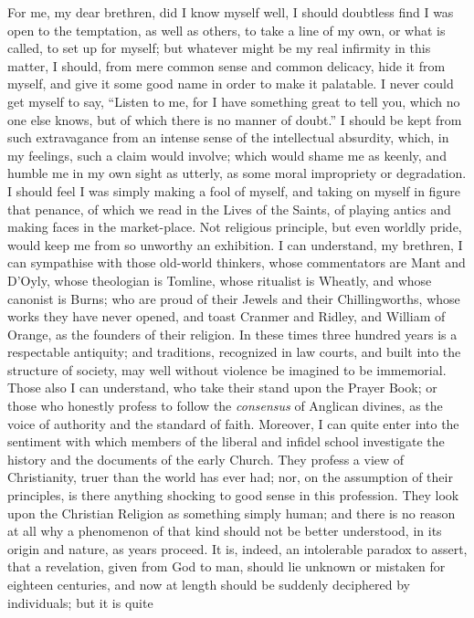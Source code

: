 For me, my dear brethren, did I know myself well, I should
doubtless find I was open to the temptation, as well as others, to
take a line of my own, or what is called, to set up for myself; but
whatever might be my real infirmity in this matter, I should, from
mere common sense and common delicacy, hide it from myself, and give
it some good name in order to make it palatable. I never could get
myself to say, ``Listen to me, for I have something great to tell
you, which no one else knows, but of which there is no manner of
doubt.'' I should be kept from such extravagance from an intense
sense of the intellectual absurdity, which, in my feelings, such a
claim would involve; which would shame me as keenly, and humble me in
my own sight as utterly, as some moral impropriety or degradation. I
should feel I was simply making a fool of myself, and taking on myself
in figure that penance, of which we read in the Lives of the Saints,
of playing antics and making faces in the market-place. Not religious
principle, but even worldly pride, would keep me from so unworthy an
exhibition. I can understand, my brethren, I can sympathise with those
old-world thinkers, whose commentators are Mant and D'Oyly, whose
theologian is Tomline, whose ritualist is Wheatly, and whose canonist
is Burns; who are proud of their Jewels and their Chillingworths,
whose works they have never opened, and toast Cranmer and Ridley, and
William of Orange, as the founders of their religion. In these times
three hundred years is a respectable antiquity; and traditions,
recognized in law courts, and built into the structure of society, may
well without violence be imagined to be immemorial. Those also I can
understand, who take their stand upon the Prayer Book; or those who
honestly profess to follow the \emph{consensus} of Anglican divines,
as the voice of authority and the standard of faith. Moreover, I can
quite enter into the sentiment with which members of the liberal and
infidel school investigate the history and the documents of the early
Church. They profess a view of Christianity, truer than the world has
ever had; nor, on the assumption of their principles, is there
anything shocking to good sense in this profession. They look upon the
Christian Religion as something simply human; and there is no reason
at all why a phenomenon of that kind should not be better understood,
in its origin and nature, as years proceed. It is, indeed, an
intolerable paradox to assert, that a revelation, given from God to
man, should lie unknown or mistaken for eighteen centuries, and now at
length should be suddenly deciphered by individuals; but it is quite
